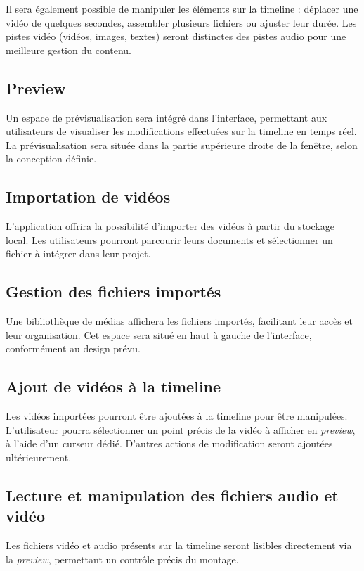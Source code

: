 \documentclass{rapport}
\begin{document}
Il sera également possible de manipuler les éléments sur la timeline : déplacer une vidéo de quelques secondes, assembler plusieurs fichiers ou ajuster leur durée. Les pistes vidéo (vidéos, images, textes) seront distinctes des pistes audio pour une meilleure gestion du contenu.

\subsection{Preview}
Un espace de prévisualisation sera intégré dans l’interface, permettant aux utilisateurs de visualiser les modifications effectuées sur la timeline en temps réel. La prévisualisation sera située dans la partie supérieure droite de la fenêtre, selon la conception définie.

\subsection{Importation de vidéos}
L’application offrira la possibilité d’importer des vidéos à partir du stockage local. Les utilisateurs pourront parcourir leurs documents et sélectionner un fichier à intégrer dans leur projet.

\subsection{Gestion des fichiers importés}
Une bibliothèque de médias affichera les fichiers importés, facilitant leur accès et leur organisation. Cet espace sera situé en haut à gauche de l’interface, conformément au design prévu.

\subsection{Ajout de vidéos à la timeline}
Les vidéos importées pourront être ajoutées à la timeline pour être manipulées. L’utilisateur pourra sélectionner un point précis de la vidéo à afficher en \textit{preview}, à l’aide d’un curseur dédié. D’autres actions de modification seront ajoutées ultérieurement.

\subsection{Lecture et manipulation des fichiers audio et vidéo}
Les fichiers vidéo et audio présents sur la timeline seront lisibles directement via la \textit{preview}, permettant un contrôle précis du montage.
\end{document}
